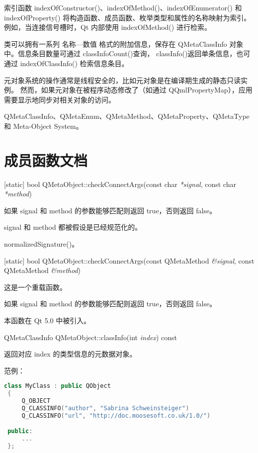索引函数 indexOfConstructor()、indexOfMethod()、indexOfEnumerator() 和 indexOfProperty() 将构造函数、成员函数、枚举类型和属性的名称映射为索引。例如，当连接信号槽时，Qt 内部使用 indexOfMethod() 进行检索。

类可以拥有一系列 名称—数值 格式的附加信息，保存在 QMetaClassInfo 对象中。信息条目数量可通过 classInfoCount()查询， classInfo()返回单条信息，也可通过 indexOfClassInfo() 检索信息条目。

\begin{notice}
元对象系统的操作通常是线程安全的，比如元对象是在编译期生成的静态只读实例。
然而，如果元对象在被程序动态修改了（如通过 QQmlPropertyMap），应用需要显示地同步对相关对象的访问。
\end{notice}

\begin{notice}[另请参阅]
QMetaClassInfo、QMetaEnum、QMetaMethod、QMetaProperty、QMetaType 和 Meta-Object System。
\end{notice}

\section{成员函数文档}

[static] bool QMetaObject::checkConnectArgs(const char \emph{*signal}, const char \emph{*method})

如果 signal 和 method 的参数能够匹配则返回 true，否则返回 false。

signal 和 method 都被假设是已经规范化的。

\begin{notice}[另请参阅]
normalizedSignature()。
\end{notice}

[static] bool QMetaObject::checkConnectArgs(const QMetaMethod \emph{\&signal}, const QMetaMethod \emph{\&method})

这是一个重载函数。

如果 signal 和 method 的参数能够匹配则返回 true，否则返回 false。

本函数在 Qt 5.0 中被引入。

QMetaClassInfo QMetaObject::classInfo(int \emph{index}) const

返回对应 index 的类型信息的元数据对象。

范例：

\begin{lstlisting}[language=C++]
class MyClass : public QObject
 {
     Q_OBJECT
     Q_CLASSINFO("author", "Sabrina Schweinsteiger")
     Q_CLASSINFO("url", "http://doc.moosesoft.co.uk/1.0/")

 public:
     ...
 };
\end{lstlisting}


